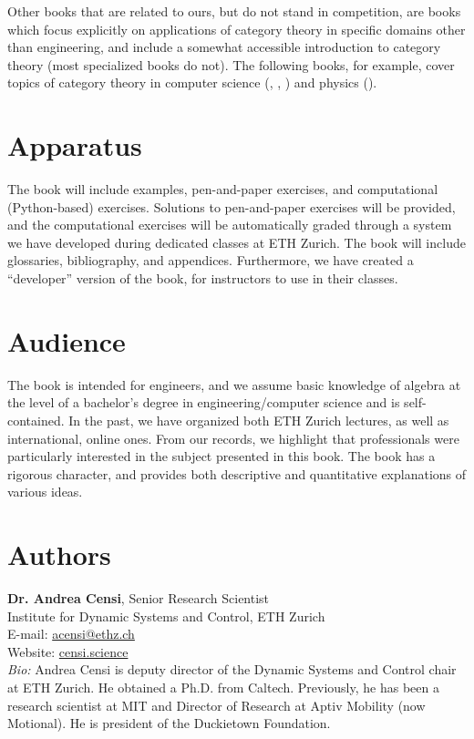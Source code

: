 \documentclass[10pt, article, one side]{memoir}
\begin{document}
Other books that are related to ours, but do not stand in competition, are books which focus explicitly on applications of category theory in specific domains other than engineering, and include a somewhat accessible introduction to category theory (most specialized books do not). The following books, for example, cover topics of category theory in computer science (\cite{BarrWells},  \cite{Milewski}, \cite{Pierce}) and physics (\cite{CoeckeKisssinger}). 
 

    \section{Apparatus}
    The book will include examples, pen-and-paper exercises, and computational (Python-based) exercises.
    Solutions to pen-and-paper exercises will be provided, and the computational exercises will be automatically graded through a system we have developed during dedicated classes at ETH Zurich.
    The book will include glossaries, bibliography, and appendices.
    Furthermore, we have created a “developer” version of the book, for instructors to use in their classes.

    \section{Audience}
    The book is intended for engineers, and we assume basic knowledge of algebra at the level of a bachelor’s degree in engineering/computer science and is self-contained.
    In the past, we have organized both ETH Zurich lectures, as well as international, online ones.
    From our records, we highlight that professionals were particularly interested in the subject presented in this book.
    The book has a rigorous character, and provides both descriptive and quantitative explanations of various ideas.

    \section{Authors}
    \noindent \textbf{Dr.
        Andrea Censi}, Senior Research Scientist\\
    Institute for Dynamic Systems and Control, ETH Zurich\\
    E-mail: \href{mailto:acensi@ethz.ch}{acensi@ethz.ch}\\
    Website: \href{https://censi.science}{censi.science}\\
    \emph{Bio:} Andrea Censi is deputy director of the Dynamic Systems and Control chair at ETH Zurich.
    He obtained a Ph.D.
    from Caltech.
    Previously, he has been a research scientist at MIT and Director of Research at Aptiv Mobility (now Motional).
    He is president of the Duckietown Foundation.
    \\
\end{document}
